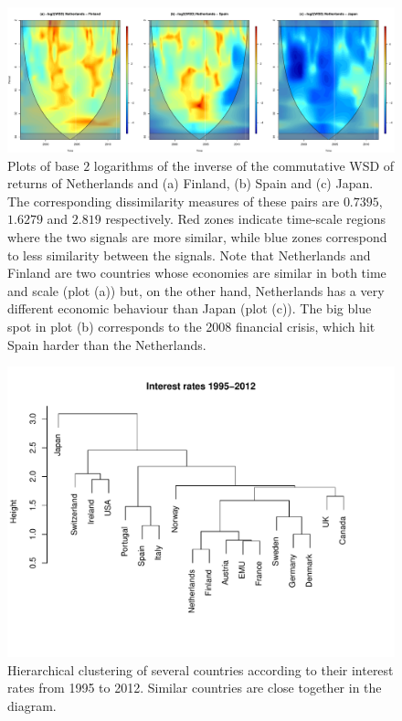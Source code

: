 \begin{figure}[tbp]
\begin{center}
  \includegraphics[width=\textwidth]{Figure13}
\end{center}
\caption{Plots of base $2$ logarithms of the inverse of the commutative WSD of returns of Netherlands and (a) Finland, (b) Spain and (c) Japan. The corresponding dissimilarity measures of these pairs are $0.7395$, $1.6279$ and $2.819$ respectively. Red zones indicate time-scale regions where the two signals are more similar, while blue zones correspond to less similarity between the signals. Note that Netherlands and Finland are two countries whose economies are similar in both time and scale (plot (a)) but, on the other hand, Netherlands has a very different economic behaviour than Japan (plot (c)). The big blue spot in plot (b) corresponds to the 2008 financial crisis, which hit Spain harder than the Netherlands.}
\label{fig:interestwsd}
\end{figure}

\begin{figure}[tbp]
\begin{center}
  \includegraphics[width=.75\textwidth]{Figure14}
\end{center}
\caption{Hierarchical clustering of several countries according to their interest rates from 1995 to 2012. Similar countries are close together in the diagram.}
\label{fig:interestrates_global}
\end{figure}

